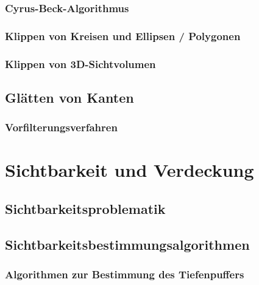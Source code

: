 \documentclass{scrreprt}
\begin{document}
\subsection{Cyrus-Beck-Algorithmus}

\subsection{Klippen von Kreisen und Ellipsen / Polygonen}

\subsection{Klippen von 3D-Sichtvolumen}

\section{Glätten von Kanten}
\subsection{Vorfilterungsverfahren}
\chapter{Sichtbarkeit und Verdeckung}
\section{Sichtbarkeitsproblematik}
\section{Sichtbarkeitsbestimmungsalgorithmen}
\subsection{Algorithmen zur Bestimmung des Tiefenpuffers}
\end{document}
